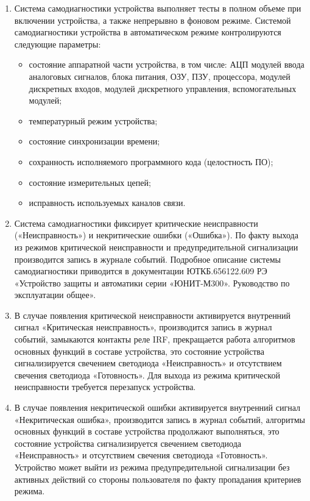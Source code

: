 \begin{enumerate}

\item
Система самодиагностики устройства выполняет тесты в полном объеме при включении устройства, а также непрерывно в фоновом режиме.
Системой самодиагностики устройства в автоматическом режиме контролируются следующие параметры:
\begin{itemize}
\item состояние аппаратной части устройства, в том числе: АЦП модулей ввода аналоговых сигналов, блока питания, ОЗУ, ПЗУ, процессора, модулей дискретных входов, модулей дискретного управления, вспомогательных модулей;
\item температурный режим устройства;
\item состояние синхронизации времени;
\item сохранность исполняемого программного кода (целостность ПО);
\item состояние измерительных цепей;
\item исправность используемых каналов связи.
\end{itemize}

\item
Система самодиагностики фиксирует критические неисправности («Неисправность») и некритические ошибки («Ошибка»). По факту выхода из режимов критической неисправности и предупредительной сигнализации производится запись в журнале событий. Подробное описание системы самодиагностики приводится в документации ЮТКБ.656122.609 РЭ «Устройство защиты и автоматики серии «ЮНИТ-М300». Руководство по эксплуатации общее».

\item
В случае появления критической неисправности активируется внутренний сигнал «Критическая неисправность», производится запись в журнал событий, замыкаются контакты реле IRF, прекращается работа алгоритмов основных функций в составе устройства, это состояние устройства сигнализируется свечением светодиода «Неисправность» и отсутствием свечения светодиода «Готовность». Для выхода из режима критической неисправности требуется перезапуск устройства.

\item
В случае появления некритической ошибки активируется внутренний сигнал «Некритическая ошибка», производится запись в журнал событий, алгоритмы основных функций в составе устройства продолжают выполняться, это состояние устройства сигнализируется свечением светодиода «Неисправность» и отсутствием свечения светодиода «Готовность». Устройство может выйти из режима предупредительной сигнализации без активных действий со стороны пользователя по факту пропадания критериев режима.

\end{enumerate}

